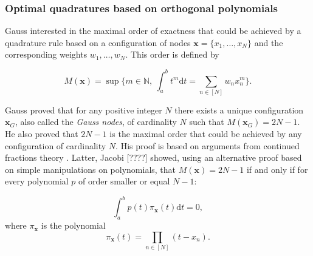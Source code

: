 \documentclass[twoside,11pt]{book}
\begin{document}
\subsubsection{Optimal quadratures based on  orthogonal polynomials}

 Gauss interested in the maximal order of exactness that could be achieved by a quadrature rule based on a configuration of nodes $\bm{x} = \{ x_{1}, \dots, x_{N} \}$ and the corresponding weights $w_{1}, \dots, w_{N}$. This order is defined by 

\begin{equation}
M(\bm{x}) = \sup \{ m \in \mathbb{N}, \: \int_{a}^{b} t^{m} \mathrm{d}t = \sum\limits_{n \in [N]} w_{n}x_{n}^{m} \}.
\end{equation}





Gauss proved that for any positive integer $N$ there exists a unique configuration $\bm{x}_{G}$, also called the \emph{Gauss nodes}, of cardinality $N$ such that $M(\bm{x}_{G}) = 2N-1$. He also proved that $2N-1$ is the maximal order that could be achieved by any configuration of cardinality $N$. His proof \citep{Gau1815} is based on arguments from continued fractions theory \citep{Khi97}.
Latter, Jacobi [????] showed, using an alternative proof based on simple manipulations on polynomials, that $M(\bm{x}) = 2N-1$ if and only if for every polynomial $p$ of order smaller or equal $N-1$:

\begin{equation}\label{eq:Legendre_orthogonality}
\int_{a}^{b} p(t) \pi_{\bm{x}}(t) \mathrm{d}t = 0,
\end{equation}
where $\pi_{\bm{x}}$ is the polynomial
\begin{equation}
\pi_{\bm{x}}(t) = \prod\limits_{n \in [N]}(t-x_{n}).
\end{equation}
\end{document}
